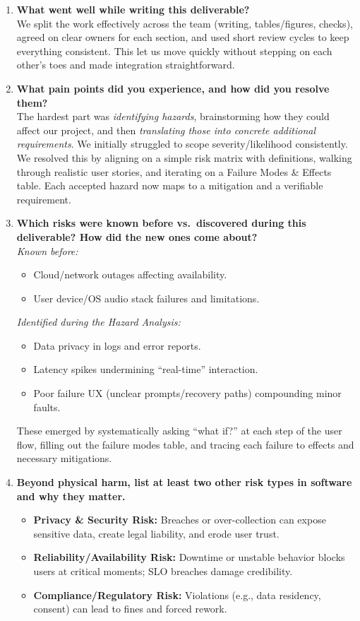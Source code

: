 \documentclass{article}
\begin{document}
\begin{enumerate}
  \item \textbf{What went well while writing this deliverable?}\\
  We split the work effectively across the team (writing, tables/figures, checks), agreed on clear owners for each section, and used short review cycles to keep everything consistent. This let us move quickly without stepping on each other’s toes and made integration straightforward.

  \item \textbf{What pain points did you experience, and how did you resolve them?}\\
  The hardest part was \emph{identifying hazards}, brainstorming how they could affect our project, and then \emph{translating those into concrete additional requirements}. We initially struggled to scope severity/likelihood consistently. We resolved this by aligning on a simple risk matrix with definitions, walking through realistic user stories, and iterating on a Failure Modes \& Effects table. Each accepted hazard now maps to a mitigation and a verifiable requirement.

  \item \textbf{Which risks were known before vs.\ discovered during this deliverable? How did the new ones come about?}\\
  \textit{Known before:}
  \begin{itemize}
    \item Cloud/network outages affecting availability.
    \item User device/OS audio stack failures and limitations.
  \end{itemize}
  \textit{Identified during the Hazard Analysis:}
  \begin{itemize}
    \item Data privacy in logs and error reports.
    \item Latency spikes undermining “real-time” interaction.
    \item Poor failure UX (unclear prompts/recovery paths) compounding minor faults.
  \end{itemize}
  These emerged by systematically asking “what if?” at each step of the user flow, filling out the failure modes table, and tracing each failure to effects and necessary mitigations.

  \item \textbf{Beyond physical harm, list at least two other risk types in software and why they matter.}\\
  \begin{itemize}
    \item \textbf{Privacy \& Security Risk:} Breaches or over-collection can expose sensitive data, create legal liability, and erode user trust.
    \item \textbf{Reliability/Availability Risk:} Downtime or unstable behavior blocks users at critical moments; SLO breaches damage credibility.
    \item \textbf{Compliance/Regulatory Risk:} Violations (e.g., data residency, consent) can lead to fines and forced rework.
  \end{itemize}
\end{enumerate}
\end{document}
